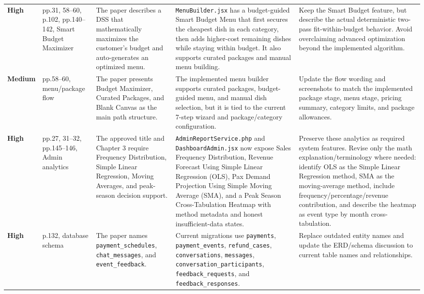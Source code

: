\documentclass[11pt]{article}
\newcommand{\severityhigh}{\textcolor{high}{\textbf{High}}}
\newcommand{\severitymedium}{\textcolor{medium}{\textbf{Medium}}}
\begin{document}
\begin{landscape}
\begin{longtable}{L{0.72in} L{1.05in} L{2.05in} L{2.55in} L{2.55in}}
\severityhigh & pp.31, 58--60, p.102, pp.140--142, Smart Budget Maximizer & The paper describes a DSS that mathematically maximizes the customer's budget and auto-generates an optimized menu. & \texttt{MenuBuilder.jsx} has a budget-guided Smart Budget Menu that first secures the cheapest dish in each category, then adds higher-cost remaining dishes while staying within budget. It also supports curated packages and manual menu building. & Keep the Smart Budget feature, but describe the actual deterministic two-pass fit-within-budget behavior. Avoid overclaiming advanced optimization beyond the implemented algorithm. \\

\severitymedium & pp.58--60, menu/package flow & The paper presents Budget Maximizer, Curated Packages, and Blank Canvas as the main path structure. & The implemented menu builder supports curated packages, budget-guided menu, and manual dish selection, but it is tied to the current 7-step wizard and package/category configuration. & Update the flow wording and screenshots to match the implemented package stage, menu stage, pricing summary, category limits, and package allowances. \\

\severityhigh & pp.27, 31--32, pp.145--146, Admin analytics & The approved title and Chapter 3 require Frequency Distribution, Simple Linear Regression, Moving Averages, and peak-season decision support. & \texttt{AdminReportService.php} and \texttt{DashboardAdmin.jsx} now expose Sales Frequency Distribution, Revenue Forecast Using Simple Linear Regression (OLS), Pax Demand Projection Using Simple Moving Average (SMA), and a Peak Season Cross-Tabulation Heatmap with method metadata and honest insufficient-data states. & Preserve these analytics as required system features. Revise only the math explanation/terminology where needed: identify OLS as the Simple Linear Regression method, SMA as the moving-average method, include frequency/percentage/revenue contribution, and describe the heatmap as event type by month cross-tabulation. \\

\severityhigh & p.132, database schema & The paper names \texttt{payment\_schedules}, \texttt{chat\_messages}, and \texttt{event\_feedback}. & Current migrations use \texttt{payments}, \texttt{payment\_events}, \texttt{refund\_cases}, \texttt{conversations}, \texttt{messages}, \texttt{conversation\_participants}, \texttt{feedback\_requests}, and \texttt{feedback\_responses}. & Replace outdated entity names and update the ERD/schema discussion to current table names and relationships. \\


\end{longtable}
\end{landscape}
\end{document}
